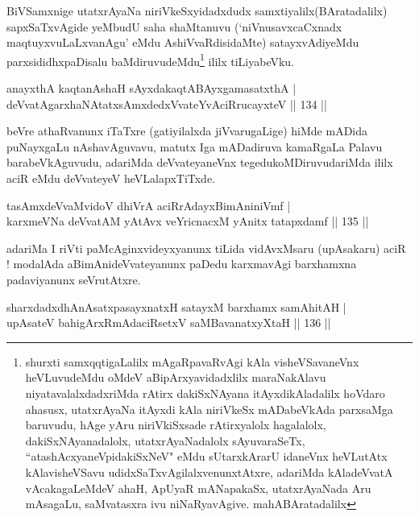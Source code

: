 \begin{artha}
BiVSamxnige utatxrAyaNa niriVkeSxyidadxdudx samxtiyalilx(BAratadalilx) sapxSaTxvAgide yeMbudU saha shaMtanuvu (`niVnusavxcaCxnadx maqtuyxvuLaLxvanAgu' eMdu AshiVvaRdisidaMte) satayxvAdiyeMdu parxsididhxpaDisalu baMdiruvudeMdu\footnote{shurxti  samxqqtigaLalilx mAgaRpavaRvAgi kAla visheVSavaneVnx heVLuvudeMdu oMdeV  aBipArxyavidadxlilx maraNakAlavu niyatavalalxdadxriMda rAtirx dakiSxNAyana itAyxdikAladalilx hoVdaro ahasusx, utatxrAyaNa itAyxdi  kAla niriVkeSx mADabeVkAda parxsaMga baruvudu, hAge yAru  niriVkiSxsade  rAtirxyalolx hagalalolx, dakiSxNAyanadalolx,  utatxrAyaNadalolx sAyuvaraSeTx, ``atashAcxyaneV\s pidakiSxNeV" eMdu  sUtarxkArarU idaneVnx heVLutAtx kAlavisheVSavu  udidxSaTxvAgilalxvenunxtAtxre, adariMda kAladeVvatA vAcakagaLeMdeV  ahaH, ApUyaR mANapakaSx, utatxrAyaNada Aru mAsagaLu, saMvatasxra ivu  niNaRyavAgive. mahABAratadalilx} ililx tiLiyabeVku.
\end{artha}

\begin{shl}
anayxthA kaqtanAshaH sAyxdakaqtABAyxgamasatxthA | \\
deVvatAgarxhaNAtatxsAmxdedxVvateYvAciRrucayxteV \hfill|| 134 || 
\end{shl}

\begin{artha}
beVre athaRvanunx iTaTxre (gatiyilalxda jiVvarugaLige) hiMde mADida
puNayxgaLu nAshavAguvavu, matutx Iga mADadiruva kamaRgaLa Palavu
barabeVkAguvudu, adariMda deVvateyaneVnx tegedukoMDiruvudariMda ililx
aciR eMdu deVvateyeV heVLalapxTiTxde.
\end{artha}


\begin{shl}
tasAmxdeVvaMvidoV dhiVrA aciRrAdayxBimAniniVmf | \\
karxmeVNa deVvatAM yAtAvx veYricnacxM yAnitx tatapxdamf \hfill|| 135 || 
\end{shl}

\begin{artha}
adariMa I riVti paMcAginxvideyxyanunx tiLida vidAvxMsaru (upAsakaru)
aciR ! modalAda aBimAnideVvateyanunx paDedu karxmavAgi barxhamxna
padaviyanunx seVrutAtxre.
\end{artha}


\begin{shl}
sharxdadxdhAnAsatxpasayxnatxH satayxM barxhamx samAhitAH | \\
upAsateV bahigArxRmAdaciRsetxV saMBavanatxyXtaH \hfill|| 136 || 
\end{shl}

